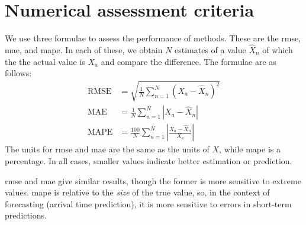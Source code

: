 \chapter{Numerical assessment criteria}
\label{app:error-functions}


We use three formulae to assess the performance of methods. These are the \gls{rmse}, \gls{mae}, and \gls{mape}. In each of these, we obtain $N$ estimates of a value $\hat X_n$ of which the the actual value is $X_a$ and compare the difference. The formulae are as follows:
\begin{align}
\label{eq:app_rmse}
\text{RMSE} &= \sqrt{\frac{1}{N}\sum_{n=1}^N \left(X_a - \hat X_n\right)^2} \\
\label{eq:app_mae}
\text{MAE} &= \frac{1}{N}\sum_{n=1}^N \left|X_a - \hat X_n\right| \\
\label{eq:app_mape}
\text{MAPE} &= \frac{100}{N}\sum_{n=1}^N \left|\frac{X_a - \hat X_n}{X_a}\right|
\end{align}
The units for \gls{rmse} and \gls{mae} are the same as the units of $X$, while \gls{mape} is a percentage. In all cases, smaller values indicate better estimation or prediction.


\Gls{rmse} and \gls{mae} give similar results, though the former is more sensitive to extreme values. \gls{mape} is relative to the \emph{size} of the true value, so, in the context of forecasting (arrival time prediction), it is more sensitive to errors in short-term predictions.

